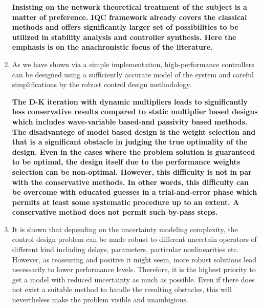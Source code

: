 \begin{enumerate}
    {\bfseries Insisting on the network theoretical treatment of the subject is a matter of preference. IQC framework already covers the 
    classical methods and offers significantly larger set of possibilities to be utilized in stability analysis and controller synthesis. Here 
    the emphasis is on the anachronistic focus of the literature. 
    }
    \item As we have shown via a simple implementation, high-performance controllers can be designed using a sufficiently accurate model of
    the system and careful simplifications by the robust control design methodology. 
    
    {\bfseries The D-K iteration with dynamic multipliers leads to significantly less conservative results compared to static multiplier 
    based designs which includes wave-variable based-and passivity based methods. The disadvantege of model based design is the weight 
    selection and that is a significant obstacle in judging the true optimality of the design. Even in the cases where the problem solution 
    is guaranteed to be optimal, the design itself due to the performance weights selection can be non-optimal. However, this difficulty 
    is not in par with the conservative methods. In other words, this difficulty can be overcome with educated guesses in a trial-and-error 
    phase which permits at least some systematic procedure up to an extent. A conservative method does not permit such by-pass steps.
    }
    \item It is shown that depending on the uncertainty modeling complexity, the control design problem can be made robust to different 
    uncertain operators of different kind including delays, parameters, particular nonlinearities etc. However, as reassuring and positive 
    it might seem, more robust solutions lead necessarily to lower performance levels. Therefore, it is the highest priority to get a 
    model with reduced uncertainty as much as possible. Even if there does not exist a suitable method to handle the resulting obstacles, 
    this will nevertheless make the problem visible and unambigious. 
    

\end{enumerate}
